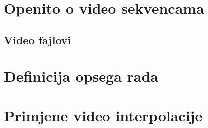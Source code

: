 \section{Op\cj enito o video sekvencama}

\subsection{Video fajlovi}

\section{Definicija opsega rada}

\section{Primjene video interpolacije}